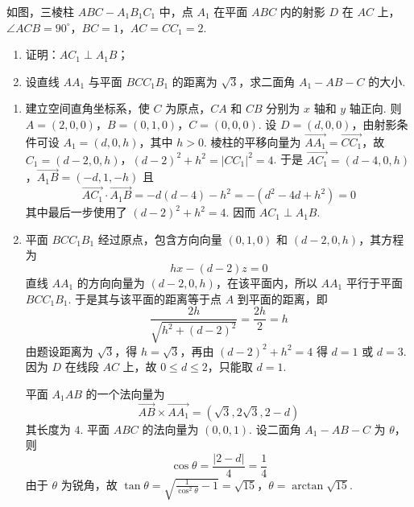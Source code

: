 \begin{problem}
如图，三棱柱 \(ABC-A_{1}B_{1}C_{1}\) 中，点 \(A_{1}\) 在平面 \(ABC\) 内的射影 \(D\) 在 \(AC\) 上，\(\angle ACB=90^{\circ}\)，\(BC=1\)，\(AC=CC_{1}=2\).

\begin{enumerate}
\item 证明：\(AC_{1}\perp A_{1}B\)；
\item 设直线 \(AA_{1}\) 与平面 \(BCC_{1}B_{1}\) 的距离为 \(\sqrt{3}\)，求二面角 \(A_{1}-AB-C\) 的大小.
\end{enumerate}

\begin{solution}
\begin{enumerate}
\item 建立空间直角坐标系，使 \(C\) 为原点，\(CA\) 和 \(CB\) 分别为
\(x\) 轴和 \(y\) 轴正向. 则
\(A=(2,0,0)\)，\(B=(0,1,0)\)，\(C=(0,0,0)\).
设 \(D=(d,0,0)\)，由射影条件可设 \(A_{1}=(d,0,h)\)，其中 \(h>0\).
棱柱的平移向量为 \(\overrightarrow{AA_{1}}=\overrightarrow{CC_{1}}\)，故
\(C_{1}=(d-2,0,h)\)，\((d-2)^{2}+h^{2}=|CC_{1}|^{2}=4\).
于是
\(\overrightarrow{AC_{1}}=(d-4,0,h)\)，\(\overrightarrow{A_{1}B}=(-d,1,-h)\)
且
\[
\overrightarrow{AC_{1}}\cdot\overrightarrow{A_{1}B}
=-d(d-4)-h^{2}=-(d^{2}-4d+h^{2})=0
\]
其中最后一步使用了 \((d-2)^{2}+h^{2}=4\). 因而
\(AC_{1}\perp A_{1}B\).
\item 平面 \(BCC_{1}B_{1}\) 经过原点，包含方向向量
\((0,1,0)\) 和 \((d-2,0,h)\)，其方程为
\[
h x-(d-2)z=0
\]
直线 \(AA_{1}\) 的方向向量为 \((d-2,0,h)\)，在该平面内，所以
\(AA_{1}\) 平行于平面 \(BCC_{1}B_{1}\). 于是其与该平面的距离等于点
\(A\) 到平面的距离，即
\[
\frac{2h}{\sqrt{h^{2}+(d-2)^{2}}}=\frac{2h}{2}=h
\]
由题设距离为 \(\sqrt3\)，得 \(h=\sqrt3\)，再由
\((d-2)^{2}+h^{2}=4\) 得 \(d=1\) 或 \(d=3\). 因为 \(D\) 在线段
\(AC\) 上，故 \(0\leqslant d\leqslant2\)，只能取 \(d=1\).

平面 \(A_{1}AB\) 的一个法向量为
\[
\overrightarrow{AB}\times\overrightarrow{AA_{1}}
=\left(\sqrt3,2\sqrt3,2-d\right)
\]
其长度为 \(4\). 平面 \(ABC\) 的法向量为 \((0,0,1)\). 设二面角
\(A_{1}-AB-C\) 为 \(\theta\)，则
\[
\cos\theta=\frac{|2-d|}{4}=\frac14
\]
由于 \(\theta\) 为锐角，故
\(\tan\theta=\sqrt{\frac{1}{\cos^{2}\theta}-1}=\sqrt{15}\)，\(\theta=\arctan\sqrt{15}\).
\end{enumerate}
\end{solution}
\end{problem}

